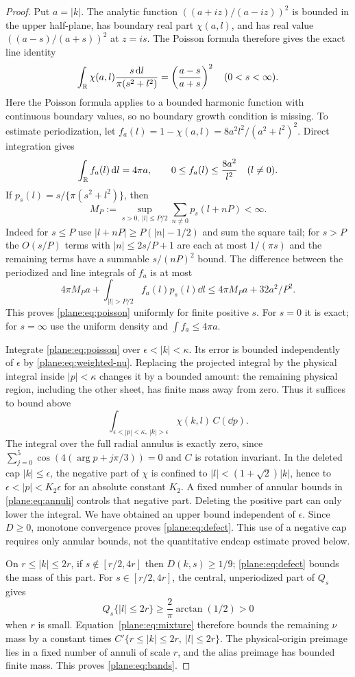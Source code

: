 \begin{proof}
Put $a=|k|$.  The analytic function
$((a+iz)/(a-iz))^2$ is bounded in the upper half-plane, has boundary
real part $\chi(a,l)$, and has real value $((a-s)/(a+s))^2$ at $z=is$.
The Poisson formula therefore gives the exact line identity
\begin{equation}
 \label{plane:eq:line-poisson}
 \int_\mathbb R\chi(a,l)\frac{s\,\mathrm d l}{\pi(s^2+l^2)}
     =\left(\frac{a-s}{a+s}\right)^2\quad(0<s<\infty).
\end{equation}
Here the Poisson formula applies to a bounded harmonic function with
continuous boundary values, so no boundary growth condition is missing.
To estimate periodization, let
$f_a(l)=1-\chi(a,l)=8a^2l^2/(a^2+l^2)^2$.  Direct integration gives
\[
 \int_\mathbb R f_a(l)\,\mathrm d l=4\pi a,
 \qquad 0\le f_a(l)\le\frac{8a^2}{l^2}\quad(l\ne0).
\]
If $p_s(l)=s/\{\pi(s^2+l^2)\}$, then
\[
 M_P:=\sup_{s>0,\ |l|\le P/2}\sum_{n\ne0}p_s(l+nP)<\infty.
\]
Indeed for $s\le P$ use $|l+nP|\ge P(|n|-1/2)$ and sum the
square tail; for $s>P$ the $O(s/P)$ terms with $|n|\le2s/P+1$
are each at most $1/(\pi s)$ and the remaining terms have a summable
$s/(nP)^2$ bound.  The difference between the periodized and line
integrals of $f_a$ is at most
\[
 4\pi M_Pa+
 \int_{|l|>P/2}f_a(l)p_s(l)\dd l
 \le4\pi M_Pa+32a^2/P^2.
\]
This proves \eqref{plane:eq:poisson} uniformly for finite positive $s$.
For $s=0$ it is exact; for $s=\infty$ use the uniform density and
$\int f_a\le4\pi a$.

Integrate \eqref{plane:eq:poisson} over
$\epsilon<|k|<\kappa$.  Its error is bounded independently of
$\epsilon$ by \eqref{plane:eq:weighted-nu}.
Replacing the projected integral by the physical integral inside
$|p|<\kappa$ changes it by a bounded amount: the remaining physical
region, including the other sheet, has finite mass away from zero.
Thus it suffices to bound above
\[
 \int_{\epsilon<|p|<\kappa,\ |k|>\epsilon}
                \chi(k,l)\,C(\dd p).
\]
The integral over the full radial annulus is exactly zero, since
$\sum_{j=0}^5\cos(4(\arg p+j\pi/3))=0$ and $C$ is rotation invariant.
In the deleted cap $|k|\le\epsilon$, the negative part of $\chi$ is
confined to $|l|<(1+\sqrt2)|k|$, hence to
$\epsilon<|p|<K_2\epsilon$ for an absolute constant $K_2$.
A fixed number of annular bounds in \eqref{plane:eq:annuli} controls
that negative part.  Deleting the positive part can only lower the
integral.  We have obtained an upper bound independent of $\epsilon$.
Since $D\ge0$, monotone convergence proves \eqref{plane:eq:defect}.
This use of a negative cap requires only annular bounds, not the
quantitative endcap estimate proved below.

On $r\le|k|\le2r$, if $s\notin[r/2,4r]$ then $D(k,s)\ge1/9$;
\eqref{plane:eq:defect} bounds the mass of this part.
For $s\in[r/2,4r]$, the central, unperiodized part of $Q_s$ gives
\[
 Q_s\{|l|\le2r\}\ge\frac2\pi\arctan(1/2)>0
\]
when $r$ is small.  Equation~\eqref{plane:eq:mixture} therefore bounds
the remaining $\nu$ mass by a constant times
$C'\{r\le|k|\le2r,\ |l|\le2r\}$.  The physical-origin preimage
lies in a fixed number of annuli of scale $r$, and the alias preimage
has bounded finite mass.  This proves \eqref{plane:eq:bands}.
\end{proof}

